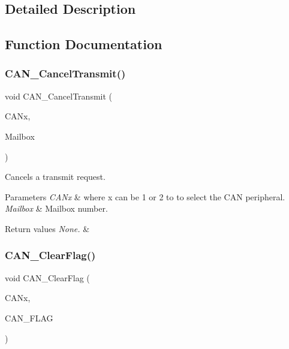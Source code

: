 \subsection{Detailed Description}


\subsection{Function Documentation}
\mbox{\label{group___c_a_n___private___functions_ga81106cdf5395a1947bfc87ec1685829e}} 
\subsubsection{\texorpdfstring{CAN\_CancelTransmit()}{CAN\_CancelTransmit()}}
{\footnotesize\ttfamily void C\+A\+N\+\_\+\+Cancel\+Transmit (\begin{DoxyParamCaption}\item[{\mbox{\hyperlink{struct_c_a_n___type_def}{C\+A\+N\+\_\+\+Type\+Def}} $\ast$}]{C\+A\+Nx,  }\item[{uint8\+\_\+t}]{Mailbox }\end{DoxyParamCaption})}



Cancels a transmit request. 


\begin{DoxyParams}{Parameters}
{\em C\+A\+Nx} & where x can be 1 or 2 to to select the C\+AN peripheral. \\
\hline
{\em Mailbox} & Mailbox number. \\
\hline
\end{DoxyParams}

\begin{DoxyRetVals}{Return values}
{\em None.} & \\
\hline
\end{DoxyRetVals}
\mbox{\label{group___c_a_n___private___functions_ga2c01646d5d3a2d7045e8dd71f58f8742}} 
\subsubsection{\texorpdfstring{CAN\_ClearFlag()}{CAN\_ClearFlag()}}
{\footnotesize\ttfamily void C\+A\+N\+\_\+\+Clear\+Flag (\begin{DoxyParamCaption}\item[{\mbox{\hyperlink{struct_c_a_n___type_def}{C\+A\+N\+\_\+\+Type\+Def}} $\ast$}]{C\+A\+Nx,  }\item[{uint32\+\_\+t}]{C\+A\+N\+\_\+\+F\+L\+AG }\end{DoxyParamCaption})}



